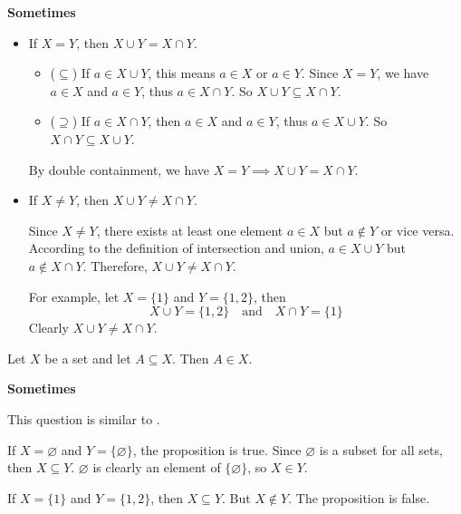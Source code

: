 \begin{mysolution}
    \textbf{Sometimes}

    \begin{itemize}  
    \item If $X=Y$, then $X \cup Y = X \cap Y$.
        \begin{itemize}
        \item ($\subseteq$) If $a \in X \cup Y$, this means $a \in X$ or $a \in Y$. Since $X=Y$, we have $a \in X$ and $a \in Y$, thus $a \in X \cap Y$. So $X \cup Y \subseteq X \cap Y$.

        \item ($\supseteq$) If $a \in X \cap Y$, then $a \in X$ and $a \in Y$, thus $a \in X \cup Y$. So $X \cap Y \subseteq X \cup Y$.
        \end{itemize}
        By double containment, we have $X=Y \implies X \cup Y = X \cap Y$.


    \item If $X \ne Y$, then $X \cup Y \ne X \cap Y$. 
     
        Since $X \ne Y$, there exists at least one element $a \in X$ but $a \notin Y$ or vice versa. According to the definition of intersection and union, $a \in X \cup Y$ but $a \notin X \cap Y$. Therefore, $X \cup Y \ne X \cap Y$.

        For example, let $X=\{1\}$ and $Y=\{1, 2\}$, then
        \[X \cup Y = \{1, 2\} \quad\text{and}\quad X \cap Y = \{1\}\]
        Clearly $X \cup Y \ne X \cap Y$.
    \end{itemize}
\end{mysolution}

\begin{chapex} %
\label{cqSetsASNEnd}
Let $X$ be a set and let $A \subseteq X$. Then $A \in X$.
\end{chapex}

\begin{mysolution}
    \textbf{Sometimes}

    This question is similar to .

    If $X = \varnothing$ and $Y=\{\varnothing\}$, the proposition is true. Since $\varnothing$ is a subset for all sets, then $X \subseteq Y$. $\varnothing$ is clearly an element of $\{\varnothing\}$, so $X \in Y$.

    If $X = \{1\}$ and $Y=\{1,2\}$, then $X \subseteq Y$. But $X \notin Y$. The proposition is false.
\end{mysolution}